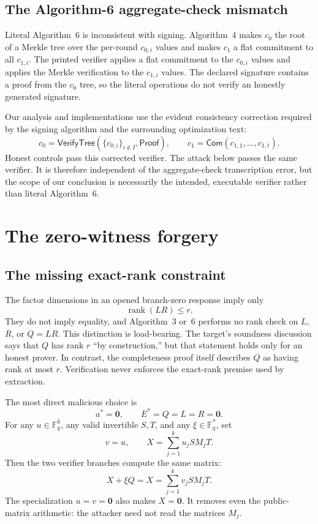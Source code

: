 \documentclass[10pt,a4paper]{article}
\newcommand{\F}{\mathbb{F}}
\newcommand{\Com}{\mathsf{Com}}
\newcommand{\rank}{\operatorname{rank}}
\newcommand{\matzero}{\mathbf{0}}
\newcommand{\vectzero}{\boldsymbol{0}}
\begin{document}
\subsection{The Algorithm-6 aggregate-check mismatch}
\label{sec:alg6}

Literal Algorithm~6 is inconsistent with signing.  Algorithm~4 makes $c_0$
the root of a Merkle tree over the per-round $c_{0,i}$ values and makes $c_1$
a flat commitment to all $c_{1,i}$.  The printed verifier applies a flat
commitment to the $c_{0,i}$ values and applies the Merkle verification to the
$c_{1,i}$ values.  The declared signature contains a proof from the $c_0$
tree, so the literal operations do not verify an honestly generated
signature.

Our analysis and implementations use the evident consistency correction
required by the signing algorithm and the surrounding optimization text:
\begin{equation}
  c_0 = \mathsf{VerifyTree}(\{c_{0,i}\}_{i\notin I},\mathsf{Proof}),
  \qquad
  c_1 = \Com(c_{1,1},\ldots,c_{1,t}).
  \label{eq:aggregatefix}
\end{equation}
Honest controls pass this corrected verifier.  The attack below passes the
same verifier.  It is therefore independent of the aggregate-check
transcription error, but the scope of our conclusion is necessarily the
intended, executable verifier rather than literal Algorithm~6.

\section{The zero-witness forgery}

\subsection{The missing exact-rank constraint}

The factor dimensions in an opened branch-zero response imply only
\[
  \rank(LR)\le r.
\]
They do not imply equality, and Algorithm~3 or~6 performs no rank check on
$L$, $R$, or $Q=LR$.  This distinction is load-bearing.  The target's
soundness discussion says that $Q$ has rank $r$ ``by construction,'' but that
statement holds only for an honest prover.  In contrast, the completeness
proof itself describes $Q$ as having rank at most $r$.  Verification never
enforces the exact-rank premise used by extraction.

The most direct malicious choice is
\begin{equation}
  a^*=\vectzero,
  \qquad E^*=Q=L=R=\matzero.
  \label{eq:zeros}
\end{equation}
For any $u\in\F_q^k$, any valid invertible $S,T$, and any
$\xi\in\F_q^*$, set
\[
  v=u,
  \qquad
  X=\sum_{j=1}^{k}u_jSM_jT.
\]
Then the two verifier branches compute the same matrix:
\begin{equation}
  X+\xi Q = X
  =\sum_{j=1}^{k}v_jSM_jT.
  \label{eq:identity}
\end{equation}
The specialization $u=v=\vectzero$ also makes $X=\matzero$.  It removes even
the public-matrix arithmetic: the attacker need not read the matrices
$M_j$.
\end{document}
